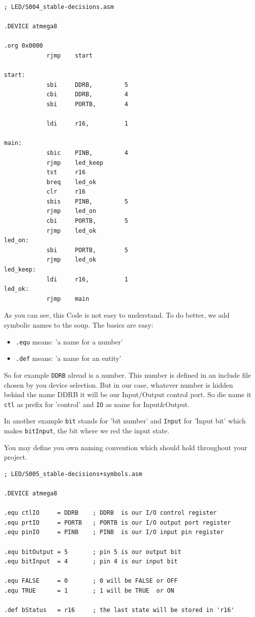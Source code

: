 \begin{lstlisting}
; LED/S004_stable-decisions.asm

.DEVICE atmega8

.org 0x0000
            rjmp    start

start:
            sbi     DDRB,         5
            cbi     DDRB,         4
            sbi     PORTB,        4

            ldi     r16,          1

main:
            sbic    PINB,         4
            rjmp    led_keep
            tst     r16
            breq    led_ok
            clr     r16
            sbis    PINB,         5
            rjmp    led_on
            cbi     PORTB,        5
            rjmp    led_ok
led_on:
            sbi     PORTB,        5
            rjmp    led_ok
led_keep:
            ldi     r16,          1
led_ok:
            rjmp    main
\end{lstlisting}


As you can see, this Code is not easy to understand. To do better, we add symbolic names to the soup. The basics are easy:

\begin{itemize}
  \item \texttt{.equ} means: 'a name for a number'
  \item \texttt{.def} means: 'a name for an entity'
\end{itemize}

So for example \texttt{DDRB} alread is a number. This number is defined in an include file chosen by you device selection. But in our case, whatever number is hidden behind the name DDRB it will be our Input/Output control port. So die name it \texttt{ctl} as prefix for 'control' and \texttt{IO} as name for Input\&Output.

In another example \texttt{bit} stands for 'bit number' and \texttt{Input} for 'Input bit' which makes \texttt{bitInput}, the bit where we red the input state.

You may define you own naming convention which should hold throughout your project.

\begin{lstlisting}
; LED/S005_stable-decisions+symbols.asm

.DEVICE atmega8

.equ ctlIO     = DDRB    ; DDRB  is our I/O control register
.equ prtIO     = PORTB   ; PORTB is our I/O output port register
.equ pinIO     = PINB    ; PINB  is our I/O input pin register

.equ bitOutput = 5       ; pin 5 is our output bit
.equ bitInput  = 4       ; pin 4 is our input bit

.equ FALSE     = 0       ; 0 will be FALSE or OFF
.equ TRUE      = 1       ; 1 will be TRUE  or ON

.def bStatus   = r16     ; the last state will be stored in 'r16'
\end{lstlisting}

